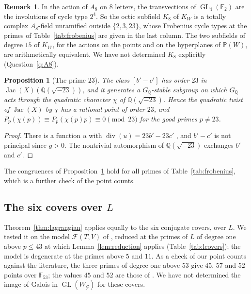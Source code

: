 \documentclass[11pt]{amsart}
\newtheorem{proposition}[theorem]{Proposition}
\theoremstyle{definition}
\newtheorem{remark}[theorem]{Remark}
\newcommand{\QQ}{\mathbb{Q}}
\newcommand{\FF}{\mathbb{F}}
\newcommand{\PP}{\mathbb{P}}
\newcommand{\Jac}{\operatorname{Jac}}
\newcommand{\GL}{\operatorname{GL}}
\newcommand{\cG}{\mathcal{G}}
\newcommand{\GQ}{G_{\QQ}}
\begin{document}
\begin{remark}
In the action of $A_8$ on $8$ letters, the transvections of $\GL_4(\FF_2)$ are the involutions of cycle type $2^4$. So the octic subfield $K_8$ of $K_W$ is a totally complex $A_8$-field unramified outside $\{2,3,23\}$, whose Frobenius cycle types at the primes of Table~\ref{tab:frobenius} are given in the last column. The two subfields of degree $15$ of $K_W$, for the actions on the points and on the hyperplanes of $\PP(W)$, are arithmetically equivalent. We have not determined $K_8$ explicitly (Question~\ref{q:A8}).
\end{remark}

\begin{proposition}[The prime $23$]\label{prop:23}
The class $[b'-c']$ has order $23$ in $\Jac(X)(\QQ(\sqrt{-23}))$, and it generates a $\GQ$-stable subgroup on which $\GQ$ acts through the quadratic character $\chi$ of $\QQ(\sqrt{-23})$. Hence the quadratic twist of $\Jac(X)$ by $\chi$ has a rational point of order $23$, and $P_p(\chi(p))\equiv P_p(\chi(p)p)\equiv0\pmod{23}$ for the good primes $p\ne23$.
\end{proposition}
\begin{proof}
There is a function $u$ with $\operatorname{div}(u)=23b'-23c'$ \cite[\S3.4]{HJLPPZ26}, and $b'-c'$ is not principal since $g>0$. The nontrivial automorphism of $\QQ(\sqrt{-23})$ exchanges $b'$ and $c'$.
\end{proof}

The congruences of Proposition~\ref{prop:23} hold for all primes of Table~\ref{tab:frobenius}, which is a further check of the point counts.

\subsection{The six covers over \texorpdfstring{$L$}{L}}
Theorem~\ref{thm:lagrangian} applies equally to the six conjugate covers, over $L$. We tested it on the model $\mathcal F(T,V)$ of \cite[\S3.7]{HJLPPZ26}, reduced at the primes of $L$ of degree one above $p\le43$ at which Lemma~\ref{lem:reduction} applies (Table~\ref{tab:lcovers}); the model is degenerate at the primes above $5$ and $11$. As a check of our point counts against the literature, the three primes of degree one above $53$ give $45$, $57$ and $52$ points over $\FF_{53}$; the values $45$ and $52$ are those of \cite[Prop.~3.14]{HJLPPZ26}. We have not determined the image of Galois in $\GL(W_\cG)$ for these covers.
\end{document}
